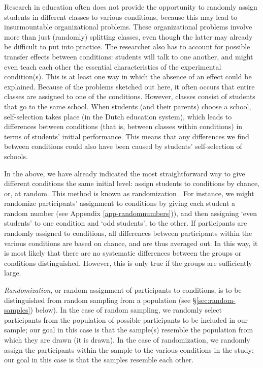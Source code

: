 \documentclass[
]{book}
\begin{document}
Research in education often does not provide the opportunity to randomly assign students in different classes to various conditions, because this may lead to insurmountable organizational problems. These organizational problems involve more than just (randomly) splitting classes, even though the latter may already be difficult to put into practice. The researcher also has to account for possible transfer effects between conditions: students will talk to one another, and might even teach each other the essential characteristics of the experimental condition(s). This is at least one way in which the absence of an effect could be explained. Because of the problems sketched out here, it often occurs that entire classes are assigned to one of the conditions. However, classes consist of students that go to the same school. When students (and their parents) choose a school, self-selection takes place (in the Dutch education system), which leads to differences between conditions (that is, between classes within conditions) in terms of students' initial performance. This means that any differences we find between conditions could also have been caused by students' self-selection of schools.

In the above, we have already indicated the most straightforward way to give different conditions the same initial level: assign students to conditions by chance, or, at random. This method is known as randomization \citep[p.294 ff]{SCC02}. For instance, we might randomize participants' assignment to conditions by giving each student a random number (see Appendix \ref{app-randomnumbers})), and then assigning `even students' to one condition and `odd students', to the other. If participants are randomly assigned to conditions, all differences between participants within the various conditions are based on chance, and are thus averaged out. In this way, it is most likely that there are no systematic differences between the groups or conditions distinguished. However, this is only true if the groups are sufficiently large.

\emph{Randomization}, or random assignment of participants to conditions, is to be distinguished from random sampling from a population (see §\ref{sec:random-samples}) below). In the case of random sampling, we randomly select participants from the population of possible participants to be included in our sample; our goal in this case is that the sample(s) resemble the population from which they are drawn (it is drawn). In the case of randomization, we randomly assign the participants within the sample to the various conditions in the study; our goal in this case is that the samples resemble each other.
\end{document}
